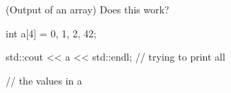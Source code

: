 (Output of an array) Does this work?



\begin{consolethree}[escapeinside=||]int a[4] = {0, 1, 2, 42};

std::cout << a << std::endl; // trying to print all

                             // the values in a 

\end{consolethree}

